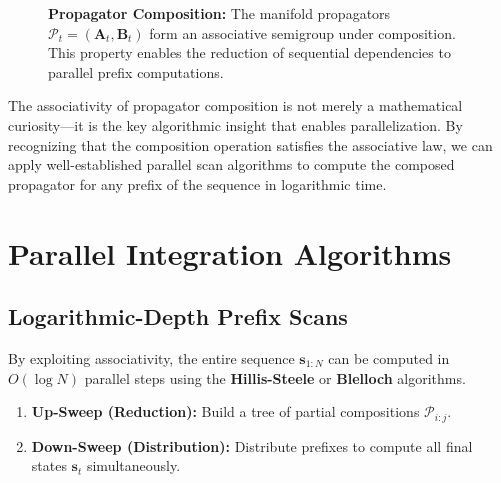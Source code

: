 \documentclass[12pt,a4paper]{article}
\newcommand{\bA}{\mathbf{A}}
\newcommand{\bs}{\mathbf{s}}
\newcommand{\cP}{\mathcal{P}}
\begin{document}
\begin{figure}[htbp]
\begin{tikzpicture}[scale=1.1]
\end{tikzpicture}
\caption{\textbf{Propagator Composition:} The manifold propagators 
         $\cP_t = (\bA_t, \mathbf{B}_t)$ form an associative semigroup 
         under composition. This property enables the reduction of 
         sequential dependencies to parallel prefix computations.}
\label{fig:propagator_composition}
\end{figure}

The associativity of propagator composition is not merely a mathematical curiosity—it is the key algorithmic insight that enables parallelization. By recognizing that the composition operation satisfies the associative law, we can apply well-established parallel scan algorithms to compute the composed propagator for any prefix of the sequence in logarithmic time.

\section{Parallel Integration Algorithms}

\subsection{Logarithmic-Depth Prefix Scans}

By exploiting associativity, the entire sequence $\bs_{1:N}$ can be computed in $O(\log N)$ parallel steps using the \textbf{Hillis-Steele} or \textbf{Blelloch} algorithms.

\begin{enumerate}[label=\textbf{\arabic*.}, leftmargin=1.5cm]
\item \textbf{Up-Sweep (Reduction):} Build a tree of partial compositions $\cP_{i:j}$.
\item \textbf{Down-Sweep (Distribution):} Distribute prefixes to compute all final states $\bs_t$ simultaneously.
\end{enumerate}
\end{document}
